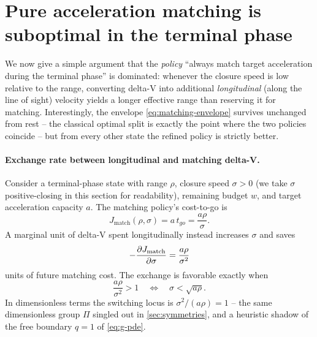 \documentclass{article}
\theoremstyle{remark}
\begin{document}
\section{Pure acceleration matching is suboptimal in the terminal phase}
\label{sec:lateral-suboptimal}

We now give a simple argument that the \emph{policy} ``always match target
acceleration during the terminal phase'' is dominated: whenever the closure
speed is low relative to the range, converting delta-V into additional
\emph{longitudinal} (along the line of sight) velocity yields a longer
effective range than reserving it for matching.  Interestingly, the envelope
\cref{eq:matching-envelope} survives unchanged from rest -- the classical
optimal split is exactly the point where the two policies coincide -- but from
every other state the refined policy is strictly better.

\paragraph{Exchange rate between longitudinal and matching delta-V.}
Consider a terminal-phase state with range $\rho$, closure speed $\sigma > 0$
(we take $\sigma$ positive-closing in this section for readability), remaining
budget $w$, and target acceleration capacity $a$.  The matching policy's
cost-to-go is
\[
  J_\text{match}(\rho, \sigma) = a \, t_{go} = \frac{a \rho}{\sigma} .
\]
A marginal unit of delta-V spent longitudinally instead increases $\sigma$ and
saves
\[
  -\pdv{J_\text{match}}{\sigma} = \frac{a\rho}{\sigma^2}
\]
units of future matching cost.  The exchange is favorable exactly when
\[
  \frac{a\rho}{\sigma^2} > 1
  \quad\Longleftrightarrow\quad
  \sigma < \sqrt{a\rho} .
\]
In dimensionless terms the switching locus is $\sigma^2 / (a \rho) = 1$ -- the
same dimensionless group $\Pi$ singled out in \cref{sec:symmetries}, and a
heuristic shadow of the free boundary $q = 1$ of \cref{eq:g-pde}.
\end{document}
